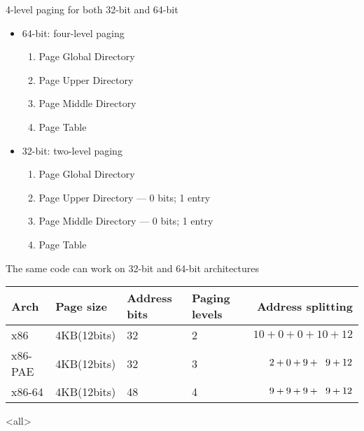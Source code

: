 \begin{frame}%
  \begin{block}{4-level paging for both 32-bit and 64-bit}
    \begin{itemize}
    \item \alert{64-bit: four-level paging}
      \begin{enumerate}
      \item Page Global Directory
      \item Page Upper Directory
      \item Page Middle Directory
      \item Page Table
      \end{enumerate}
    \item \alert{32-bit: two-level paging}
      \begin{enumerate}
      \item Page Global Directory
      \item Page Upper Directory --- 0 bits; 1 entry
      \item Page Middle Directory --- 0 bits; 1 entry
      \item Page Table
      \end{enumerate}
    \end{itemize}
    \alert{The same code can work on 32-bit and 64-bit architectures}
  \end{block}
    \begin{center}
    \begin{scriptsize}
      \begin{tabular}{llm{3em}m{3em}r}
        \hline
        Arch&Page size&Address bits&Paging levels&Address splitting\\\hline
        x86 &4KB(12bits) &32 &2 &$10+0+0+10+12$\\
        x86-PAE&4KB(12bits)&32&3&$2+0+9+\hspace{.6em}9+12$\\
        x86-64&4KB(12bits)&48&4&$9+9+9+\hspace{.6em}9+12$\\\hline
      \end{tabular}
    \end{scriptsize}
  \end{center}
\end{frame}

\begin{frame}
  \begin{refsection}
    \nocite{wiki:mm, wiki:vm}
    \printbibliography[heading=none]
  \end{refsection}
\end{frame}

\mode<all>
